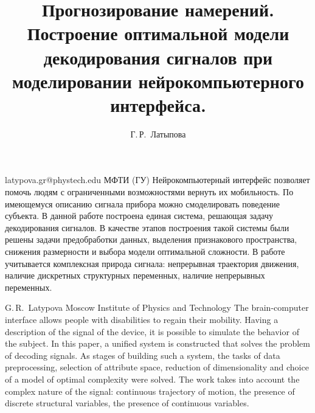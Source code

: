 \documentclass[12pt,twoside]{article}
\begin{document}
\title
    {Прогнозирование намерений. Построение оптимальной модели декодирования сигналов при моделировании нейрокомпьютерного интерфейса.}
\author
    {Г.\,Р.~Латыпова} 
\email
    {latypova.gr@phystech.edu}
\organization
    {МФТИ (ГУ)}
\abstract
    {Нейрокомпьютерный интерфейс позволяет помочь людям с ограниченными возможностями вернуть их мобильность. По имеющемуся описанию сигнала прибора можно смоделировать поведение субъекта. В данной работе построена единая система, решающая задачу декодирования сигналов. В качестве этапов построения такой системы были решены задачи предобработки данных, выделения признакового пространства, снижения размерности и выбора модели оптимальной сложности. В работе учитывается комплексная природа сигнала: непрерывная траектория движения, наличие дискретных структурных переменных, наличие непрерывных переменных.}

\authorEng
    {G.\,R.~Latypova}
\organizationEng
    {Moscow Institute of Physics and Technology}
\abstractEng
    {The brain-computer interface allows people with disabilities to regain their mobility. Having a description of the signal of the device, it is possible to simulate the behavior of the subject. In this paper, a unified system is constructed that solves the problem of decoding signals. As stages of building such a system, the tasks of data preprocessing, selection of attribute space, reduction of dimensionality and choice of a model of optimal complexity were solved. The work takes into account the complex nature of the signal: continuous trajectory of motion, the presence of discrete structural variables, the presence of continuous variables.}

\maketitle
\end{document}
